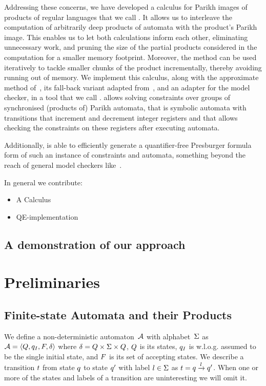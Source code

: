 \documentclass[acmsmall,review,anonymous]{acmart}\settopmatter{printfolios=true,printccs=false,printacmref=true}
\theoremstyle{definition}
\begin{document}
Addressing these concerns, we have developed a calculus for Parikh images of
products of regular languages that we call \Calculus{}. It allows us to
interleave the computation of arbitrarily deep products of automata with the
product's Parikh image. This enables us to let both calculations inform each
other, eliminating unnecessary work, and pruning the size of the partial
products considered in the computation for a smaller memory footprint. Moreover,
the method can be used iteratively to tackle smaller chunks of the product
incrementally, thereby avoiding running out of memory. We implement this
calculus, along with the approximate method of~\cite{approximate-parikh}, its
fall-back variant adapted from~\cite{generate-parikh-image}, and an adapter for
the \Nuxmv{} model checker, in a tool that we call \Catra{}. \Catra{} allows
solving constraints over groups of synchronised (products of) Parikh automata,
that is symbolic automata with transitions that increment and decrement integer
registers and that allows checking the constraints on these registers after
executing automata.

Additionally, \Catra{} is able to efficiently generate a quantifier-free
Presburger formula form of such an instance of constraints and automata,
something beyond the reach of general model checkers like~\Nuxmv{}.

In general we contribute:
\begin{itemize}
\item A Calculus
\item QE-implementation
\end{itemize}

\subsection{A demonstration of our approach}

\section{Preliminaries}

\subsection{Finite-state Automata and their Products}
We define a non-deterministic automaton~$\mathcal{A}$ with alphabet~$\Sigma$
as $\mathcal{A} = \left\langle Q, q_I, F, \delta\right\rangle$ where $\delta = Q \times \Sigma
\times Q$, $Q$ is its states, $q_I$ is w.l.o.g. assumed to
be the single initial state, and $F$ is its set of accepting
states.  We describe a transition $t$ from state $q$ to state
$q'$ with label $l \in \Sigma$ as $t =
q \xrightarrow{l} q'$. When one or more of the states and
labels of a transition are uninteresting we will omit it.
\end{document}
